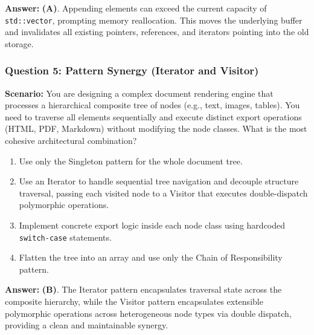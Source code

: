 \textbf{Answer:} \textbf{(A)}. Appending elements can exceed the current capacity of \texttt{std::vector}, prompting memory reallocation. This moves the underlying buffer and invalidates all existing pointers, references, and iterators pointing into the old storage.

\subsubsection*{Question 5: Pattern Synergy (Iterator and Visitor)}
\textbf{Scenario:} You are designing a complex document rendering engine that processes a hierarchical composite tree of nodes (e.g., text, images, tables). You need to traverse all elements sequentially and execute distinct export operations (HTML, PDF, Markdown) without modifying the node classes. What is the most cohesive architectural combination?

\begin{enumerate}[label=(\Alph*)]
    \item Use only the Singleton pattern for the whole document tree.
    \item Use an Iterator to handle sequential tree navigation and decouple structure traversal, passing each visited node to a Visitor that executes double-dispatch polymorphic operations.
    \item Implement concrete export logic inside each node class using hardcoded \texttt{switch-case} statements.
    \item Flatten the tree into an array and use only the Chain of Responsibility pattern.
\end{enumerate}

\textbf{Answer:} \textbf{(B)}. The Iterator pattern encapsulates traversal state across the composite hierarchy, while the Visitor pattern encapsulates extensible polymorphic operations across heterogeneous node types via double dispatch, providing a clean and maintainable synergy.